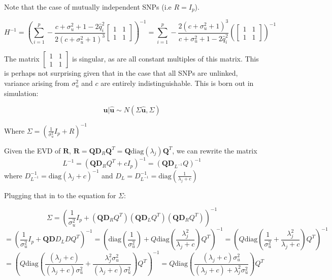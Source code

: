 Note that the case of mutually independent SNPs (i.e \(R=I_p\)). 

$$H^{-1}=\left(\sum_{i=1}^p - \frac{c +  \sigma_u^2 + 1 - 2 \hat{q}_i^2}{2 (c + \sigma_u^2 + 1)^3}   
\begin{bmatrix} 1 & 1\\ 1 & 1\end{bmatrix}\right)^{-1}=\sum_{i=1}^p - \frac{2 (c + \sigma_u^2 + 1)^3}{c +  \sigma_u^2 + 1 - 2 \hat{q}_i^2}
\left(\begin{bmatrix} 1 & 1\\ 1 & 1\end{bmatrix}\right)^{-1}$$

The matrix \(\begin{bmatrix} 1 & 1\\ 1 & 1\end{bmatrix}\) is singular, as are all constant multiples of this matrix.  This is perhaps not surprising given that in the case that all SNPs are unlinked, variance arising from \(\sigma_u^2\) and \(c\) are entirely indistinguishable.  This is born out in simulation:





\[ \textbf{u}|\hat{\textbf{u}} \sim N(\Sigma \hat{\textbf{u}},\Sigma)\]

Where $\Sigma = {\left(\frac{1}{\sigma^2_u} I_p +R\right)}^{-1}$


Given the EVD of $\textbf{R}$, \(\textbf{R}=\textbf{Q}\textbf{D}_{R}\textbf{Q}^{T}=\textbf{Q} \text{diag}\left(\lambda_j\right)\textbf{Q}^{T}\), we can rewrite the matrix 
$$L^{-1}=(\textbf{Q}\textbf{D}_RQ^{T}+cI_p)^{-1}=(\textbf{Q}\textbf{D}_{L^{-1}}Q)^{-1}$$ where \(D_{L^{-1}}^{-1}=\text{diag}\left( \lambda_j+c \right)^{-1}\) and \(D_L=D_{L^{-1}}^{-1}=\text{diag}\left(\frac{1}{\lambda_j+c} \right)\)

Plugging that in to the equation for \(\Sigma\): 

$$\Sigma= \left(\frac{1}{\sigma^2_u} I_p+(\textbf{Q}\textbf{D}_RQ^{T})(\textbf{Q}\textbf{D}_LQ^{T})(\textbf{Q}\textbf{D}_RQ^{T})\right)^{-1}$$
$$=(\frac{1}{\sigma^2_u} I_p+\textbf{Q}\textbf{D}D_LDQ^{T})^{-1}= \left( \text{diag}\left(\frac{1}{\sigma_u^2}\right) + Q\text{diag}\left(\frac{\lambda_j^2}{\lambda_j+c}\right)Q^{T} \right)^{-1} = \left(Q \text{diag}\left( \frac{1}{\sigma_u^2}+\frac{\lambda_j^2}{\lambda_j+c}\right)Q^{T}\right)^{-1}$$
$$=\left(Q \text{diag}\left( \frac{(\lambda_j+c)}{(\lambda_j+c)\sigma_u^2}+\frac{\lambda_j^2\sigma_u^2}{(\lambda_j+c)\sigma_u^2}\right)Q^{T}\right)^{-1}=Q \text{diag}\left(\frac{(\lambda_j+c)\sigma_u^2}{(\lambda_j+c)+\lambda_j^2\sigma_u^2} \right)Q^{T}$$


